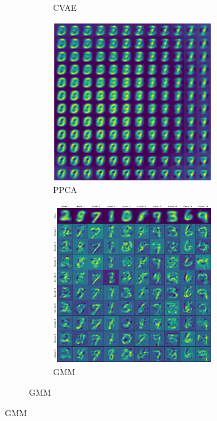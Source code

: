 \begin{figure}[!h]
\begin{subfigure}[t]{0.60\textwidth}
\begin{subfigure}[t]{0.49\textwidth}
			\caption{CVAE}
			\label{fig:cvae:interpolation}
		\end{subfigure}
		\begin{subfigure}[t]{0.49\textwidth}
			\centering
			\includegraphics[width = 1\textwidth]{figures/ppca/interpolation}
			\caption{PPCA}
			\label{fig:ppca:interpolation}
		\end{subfigure}
		\begin{subfigure}[t]{0.49\textwidth}
			\centering
			\includegraphics[width = 1\textwidth]{figures/gmm/interpolation}
			\caption{GMM}
			\label{fig:gmm:interpolation}
		\end{subfigure}	
	\end{subfigure}


\end{figure}
